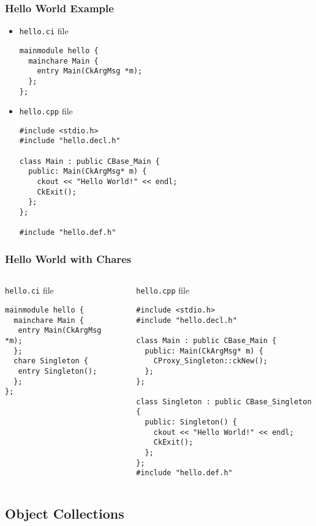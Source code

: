 \begin{frame}[fragile]
   \frametitle{Hello World Example}\scriptsize
\begin{itemize}
\item \texttt{hello.ci} file
   \begin{lstlisting}
mainmodule hello {
  mainchare Main {
    entry Main(CkArgMsg *m);
  };
};
   \end{lstlisting}
\item \texttt{hello.cpp} file
\lstset{basicstyle=\footnotesize}
   \begin{lstlisting}
#include <stdio.h>
#include "hello.decl.h"

class Main : public CBase_Main {
  public: Main(CkArgMsg* m) {
    ckout << "Hello World!" << endl;
    CkExit();
  };
};

#include "hello.def.h"
   \end{lstlisting}
\end{itemize}
\end{frame}

\begin{frame}[fragile]
   \frametitle{Hello World with Chares}\scriptsize
\begin{columns}
\begin{column}{.45\linewidth}
\texttt{hello.ci} file
   \begin{lstlisting}
mainmodule hello {
  mainchare Main { 
   entry Main(CkArgMsg *m); 
  };
  chare Singleton {
   entry Singleton();
  };
};
   \end{lstlisting}
\end{column}
\begin{column}{.55\linewidth}
\texttt{hello.cpp} file
\begin{lstlisting}
#include <stdio.h>
#include "hello.decl.h"

class Main : public CBase_Main {
  public: Main(CkArgMsg* m) {
    CProxy_Singleton::ckNew();
  };
};

class Singleton : public CBase_Singleton {
  public: Singleton() {
    ckout << "Hello World!" << endl;
    CkExit();
  };
};
#include "hello.def.h"
\end{lstlisting}
\end{column}
\end{columns}
\end{frame}


\subsection[Collections]{Object Collections}





